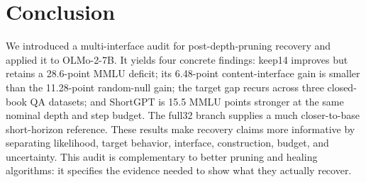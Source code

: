 \section{Conclusion}
\label{sec:conclusion}

We introduced a multi-interface audit for post-depth-pruning recovery and
applied it to OLMo-2-7B. It yields four concrete findings: keep14 improves but
retains a 28.6-point MMLU deficit; its 6.48-point content-interface gain is
smaller than the 11.28-point random-null gain; the target gap recurs across
three closed-book QA datasets; and ShortGPT is 15.5 MMLU points stronger at the
same nominal depth and step budget. The full32 branch supplies a much
closer-to-base short-horizon reference. These results make recovery claims more
informative by separating likelihood, target behavior, interface,
construction, budget, and uncertainty. This audit is complementary to better
pruning and healing algorithms: it specifies the evidence needed to show what
they actually recover.
